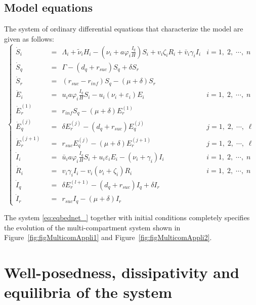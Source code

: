 \documentclass[a4paper]{article}
\begin{document}
\subsection{Model equations}\label{subsec.Assumption3}
\noindent  The  system of ordinary differential equations that characterize the model are given as follows:
%
\begin{equation}
\left\{
\begin{aligned}
\dot S_i &~~=~~\Lambda_i+\widetilde \nu_i H_i - \left(\nu_i+a\varphi_i \frac{I_q}{H}\right)S_i + v_i\zeta_iR_i+\bar v_i\gamma_iI_i
& i=1,\;2,\;\cdots,\; n \\%
\dot S_q &~~=~~\Gamma- (d_q+r_{suc}) S_q + \delta S_r & \,\\
\dot S_r &~~=~~ (r_{suc}-r_{inf}) S_q-(\mu+\delta)S_r\\%
\dot E_i &~~=~~u_ia\varphi_i \frac{I_q}{H}S_i-u_i(\nu_i+\varepsilon_i) E_i &i=1,\;2,\;\cdots,\; n\\%
\dot E^{(1)}_r &~~=~~r_{inf}  S_q-(\mu+\delta) E^{(1)}_r & \,\\%
\dot E^{(j)}_q &~~=~~\delta E^{(j)}_r - (d_q+r_{suc})E^{(j)}_q & j = 1,\;2,\;\cdots,\; \ell \\%
\dot  E^{(j+1)}_r &~~=~~r_{suc}  E^{(j)}_q-(\mu+\delta) E^{(j+1)}_r &j = 1,\;2,\;\cdots,\; \ell \\%
\dot I_i &~~=~~\bar u_ia\varphi_i \frac{I_q}{H}S_i+u_i\varepsilon_iE_i - (\nu_i+\gamma_i)I_i & i = 1,\;2,\;\cdots,\; n \\%
\dot R_i &~~=~~v_i\gamma_i I_i - v_i(\nu_i+\zeta_i)R_i&i=1,\;2,\;\cdots,\; n 
\\[6pt]
\dot I_q &~~=~~\delta E^{(l+1)}_r - (d_q+r_{suc}) I_q +\delta I_r& \, \\%
\dot I_r &~~=~~r_{suc} I_q - (\mu+\delta)I_r & \,
\end{aligned}
\right.
\label{eq:eqbednet_}
\end{equation} 

\noindent The system \eqref{eq:eqbednet_} together with initial conditions completely specifies the evolution of the multi-compartment system shown in Figure~\ref{fig:figMulticomAppli1} and Figure~\ref{fig:figMulticomAppli2}. %
 
 
\section{Well-posedness, dissipativity and equilibria of the system}\label{dfestabana}
\end{document}
